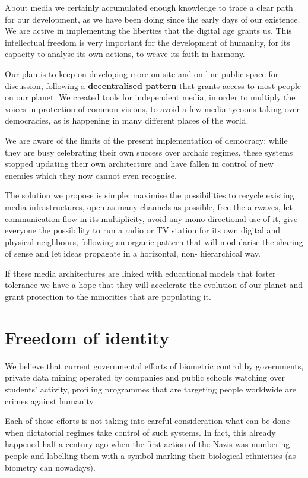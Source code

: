About media we certainly accumulated enough knowledge to trace a clear path for
our development, as we have been doing since the early days of our existence. We
are active in implementing the liberties that the digital age grants us. This
intellectual freedom is very important for the development of humanity, for its
capacity to analyse its own actions, to weave its faith in harmony.

Our plan is to keep on developing more on-site and on-line public space for
discussion, following a \textbf{decentralised pattern} that grants access to
most people on our planet. We created tools for independent media, in order to
multiply the voices in protection of common visions, to avoid a few media
tycoons taking over democracies, as is happening in many dif\hbox{}ferent places
of the world.

We are aware of the limits of the present implementation of democracy: while
they are busy celebrating their own success over archaic regimes, these systems
stopped updating their own architecture and have fallen in control of new
enemies which they now cannot even recognise.

The solution we propose is simple: maximise the possibilities to recycle
existing media infrastructures, open as many channels as possible, free the
airwaves, let communication f\hbox{}low in its multiplicity, avoid any
mono-directional use of it, give everyone the possibility to run a radio or TV
station for its own digital and physical neighbours, following an organic
pattern that will modularise the sharing of sense and let ideas propagate in a
horizontal, non- hierarchical way.

If these media architectures are linked with educational models that foster
tolerance we have a hope that they will accelerate the evolution of our planet
and grant protection to the minorities that are populating it.


\section{Freedom of identity}
\label{s:weaver_birds:freedom_identity}

We believe that current governmental ef\hbox{}forts of biometric control by
governments, private data mining operated by companies and public schools
watching over students' activity, prof\hbox{}iling programmes that are targeting
people worldwide are crimes against humanity.

Each of those ef\hbox{}forts is not taking into careful consideration what can
be done when dictatorial regimes take control of such systems. In fact, this
already happened half a century ago when the f\hbox{}irst action of the Nazis
was numbering people and labelling them with a symbol marking their biological
ethnicities (as biometry can nowadays).

